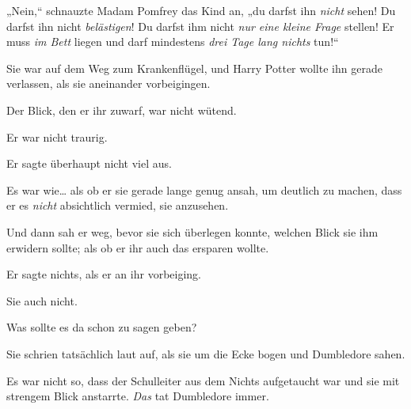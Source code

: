 
„Nein,“ schnauzte Madam Pomfrey das Kind an, „du darfst ihn \emph{nicht} sehen! Du darfst ihn nicht \emph{belästigen}! Du darfst ihm nicht \emph{nur eine kleine Frage} stellen! Er muss \emph{im Bett} liegen und darf mindestens \emph{drei Tage lang nichts} tun!“


Sie war auf dem Weg zum Krankenflügel, und Harry Potter wollte ihn gerade verlassen, als sie aneinander vorbeigingen.

Der Blick, den er ihr zuwarf, war nicht wütend.

Er war nicht traurig.

Er sagte überhaupt nicht viel aus.

Es war wie… als ob er sie gerade lange genug ansah, um deutlich zu machen, dass er es \emph{nicht} absichtlich vermied, sie anzusehen.

Und dann sah er weg, bevor sie sich überlegen konnte, welchen Blick sie ihm erwidern sollte; als ob er ihr auch das ersparen wollte.

Er sagte nichts, als er an ihr vorbeiging.

Sie auch nicht.

Was sollte es da schon zu sagen geben?


Sie schrien tatsächlich laut auf, als sie um die Ecke bogen und Dumbledore sahen.

Es war nicht so, dass der Schulleiter aus dem Nichts aufgetaucht war und sie mit strengem Blick anstarrte. \emph{Das} tat Dumbledore immer.

